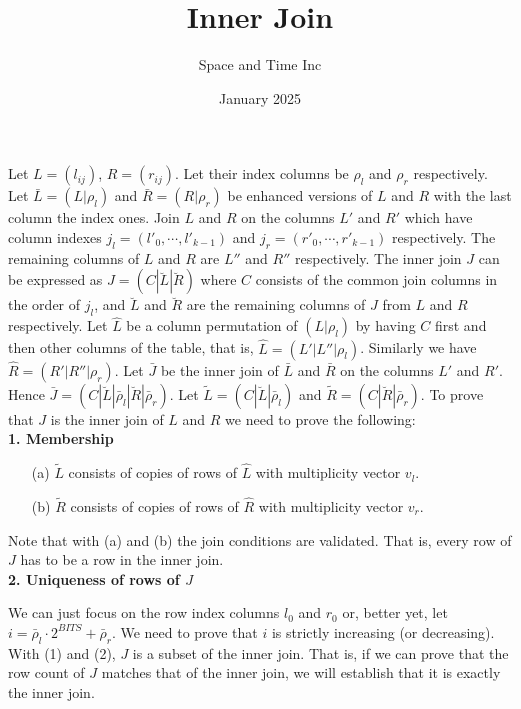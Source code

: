 \documentclass[11pt]{article}
\title{Inner Join}
\author{Space and Time Inc}
\date{January 2025}
\begin{document}
\maketitle

\noindent Let $L = (l_{ij})$, $R = (r_{ij})$. Let their index columns be $\rho_l$ and $\rho_r$ respectively. Let $\bar{L} = (L|\rho_l)$ and $\bar{R} = (R|\rho_r)$ be enhanced versions of $L$ and $R$ with the last column the index ones. Join $L$ and $R$ on the columns $L'$ and $R'$ which have column indexes $j_l = (l'_0,\cdots, l'_{k-1})$ and $j_r = (r'_0,\cdots, r'_{k-1})$ respectively. The remaining columns of $L$ and $R$ are $L''$ and $R''$ respectively. The inner join $J$ can be expressed as $J = (C|\breve{L}|\breve{R})$ where $C$ consists of the common join columns in the order of $j_l$, and $\breve{L}$ and $\breve{R}$ are the remaining columns of $J$ from $L$ and $R$ respectively.
Let $\hat{L}$ be a column permutation of $(L|\rho_l)$ by having $C$ first and then other columns of the table, that is, $\hat{L} = (L'|L''|\rho_l)$. Similarly we have $\hat{R} = (R'|R''|\rho_r)$. Let $\bar{J}$ be the inner join of $\bar{L}$ and $\bar{R}$ on the columns $L'$ and $R'$. Hence $\bar{J}=(C|\breve{L}|\bar{\rho}_l|\breve{R}|\bar{\rho}_r)$. Let $\tilde{L}=(C|\breve{L}|\bar{\rho}_l)$ and $\tilde{R}=(C|\breve{R}|\bar{\rho}_r)$. To prove that $J$ is the inner join of $L$ and $R$ we need to prove the following:\\

\textbf{1. Membership}
\begin{enumerate}
  \item[(a)] $\tilde{L}$ consists of copies of rows of $\hat{L}$ with multiplicity vector $v_l$.
  \item[(b)] $\tilde{R}$ consists of copies of rows of $\hat{R}$ with multiplicity vector $v_r$.
\end{enumerate}

\noindent Note that with (a) and (b) the join conditions are validated. That is, every row of $J$ has to be a row in the inner join.\\

\textbf{2. Uniqueness of rows of $J$}

We can just focus on the row index columns $l_0$ and $r_0$ or, better yet, let $i = \bar{\rho}_l \cdot 2^{BITS} + \bar{\rho}_r$. We need to prove that $i$ is strictly increasing (or decreasing).\\
\noindent With (1) and (2), $J$ is a subset of the inner join. That is, if we can prove that the row count of $J$ matches that of the inner join, we will establish that it is exactly the inner join.\\
\end{document}
